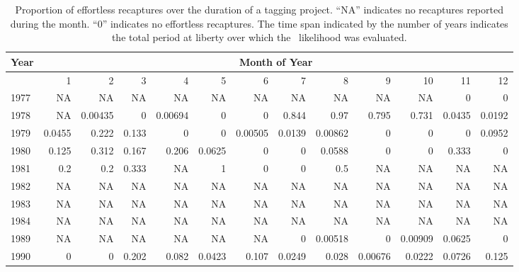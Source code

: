 \begin{sidewaystable}
{\footnotesize
\caption[Effortless recaptures by month]{Proportion of effortless
recaptures over the duration of a tagging project. ``NA'' indicates no
recaptures reported during the month. ``0'' indicates no effortless
recaptures. The time span indicated by the number of years indicates
the total period at liberty over which the \TE\ likelihood was
evaluated.}
\label{tab:monthlyeffortless}
\begin{center}
\begin{tabular}{lrrrrrrrrrrrr}
\hline
Year & \multicolumn{12}{c}{Month of Year}\\
\hline
      &        1  &       2 &        3  &       4 &        5 &        6 &        7 &        8 &        9 &       10&        11  &      12\\
\hline
 1977 &       NA &       NA &       NA &       NA &       NA & NA &       NA &       NA &       NA &       NA &        0 &        0\\
 1978 &       NA &  0.00435 &        0 &  0.00694 &        0 & 0 &    0.844 &     0.97 &    0.795 &    0.731 &   0.0435 &   0.0192\\
 1979 &   0.0455 &    0.222 &    0.133 &        0 &        0 & 0.00505 &   0.0139 &  0.00862 &        0 &        0 &        0 & 0.0952\\
 1980 &    0.125 &    0.312 &    0.167 &    0.206 &   0.0625 & 0 &        0 &   0.0588 &        0 &        0 &    0.333 &        0\\
 1981 &      0.2 &      0.2 &    0.333 &       NA &        1 & 0 &        0 &      0.5 &       NA &       NA &       NA &       NA\\
 1982 &       NA &       NA &       NA &       NA &       NA & NA &       NA &       NA &       NA &       NA &       NA &       NA\\
 1983 &       NA &       NA &       NA &       NA &       NA & NA &       NA &       NA &       NA &       NA &       NA &       NA\\
 1984 &       NA &       NA &       NA &       NA &       NA & NA &       NA &       NA &       NA &       NA &       NA &       NA\\
\hline
 1989 &       NA &       NA &       NA &       NA &       NA & NA &        0 &  0.00518 &        0 &  0.00909 &   0.0625 &        0\\
 1990 &        0 &        0 &    0.202 &    0.082 &   0.0423 & 0.107 &   0.0249 &    0.028 &  0.00676 &   0.0222 &   0.0726 & 0.125\\

\end{tabular}
\end{center}}
\end{sidewaystable}
